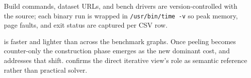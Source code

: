 \label{sec:exp-repro}
Build commands, dataset URLs, and bench drivers are version-controlled with the source; each binary run is wrapped in \texttt{/usr/bin/time~-v} so peak memory, page faults, and exit status are captured per CSV row.

\spinStar{} is faster and lighter than \cbnd{} across the benchmark graphs.
%
Once peeling becomes counter-only the construction phase emerges as the new dominant cost, and \paraBuild{} addresses that shift.
%
\spin{} confirms the direct iterative view's role as semantic reference rather than practical solver.
